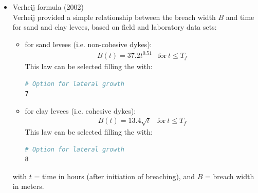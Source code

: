 \begin{itemize}
\item Verheij formula (2002) \\
Verheij \cite{Verheij2002} provided a simple relationship between the breach
width $B$ and time for sand and clay levees, based on field and laboratory data sets:
\begin{itemize}
\item for sand levees (i.e. non-cohesive dykes):
\begin{equation}
\begin{array}{lc}
B(t)=37.2t^{0.51} & \text{for}~t\leq T_f
\end{array}
\end{equation}
This law can be selected filling the  with:
\begin{lstlisting}[language=bash]
# Option for lateral growth
7
\end{lstlisting}
\item for clay levees (i.e. cohesive dykes):
\begin{equation}
\begin{array}{lc}
B(t)=13.4\sqrt{t} & \text{for}~t\leq T_f
\end{array}
\end{equation}
This law can be selected filling the  with:
\begin{lstlisting}[language=bash]
# Option for lateral growth
8
\end{lstlisting}
\end{itemize}
with $t$ = time in hours (after initiation of breaching), and $B$ = breach width in meters.


\end{itemize}
